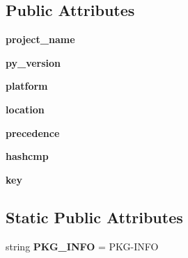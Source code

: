 \subsection*{Public Attributes}
\begin{DoxyCompactItemize}
\item 
\mbox{\label{classpkg__resources_1_1_distribution_a5a41ba765e57c1fe39b6405c2dff69c7}} 
{\bfseries project\+\_\+name}
\item 
\mbox{\label{classpkg__resources_1_1_distribution_a94c84ff74167eef63fecce9f5e3c2a85}} 
{\bfseries py\+\_\+version}
\item 
\mbox{\label{classpkg__resources_1_1_distribution_a0d3120e21ef127c42294a9ad2149613d}} 
{\bfseries platform}
\item 
\mbox{\label{classpkg__resources_1_1_distribution_a48f64f0791d0dffea14e22b9dbc210b3}} 
{\bfseries location}
\item 
\mbox{\label{classpkg__resources_1_1_distribution_afaa162e116709a2b7f4d5e2cd2f4bdcc}} 
{\bfseries precedence}
\item 
\mbox{\label{classpkg__resources_1_1_distribution_af308221b891f0ecdab82948e96bd77be}} 
{\bfseries hashcmp}
\item 
\mbox{\label{classpkg__resources_1_1_distribution_acd3cd8d8ebc1d5b72cee86c87e45049f}} 
{\bfseries key}
\end{DoxyCompactItemize}
\subsection*{Static Public Attributes}
\begin{DoxyCompactItemize}
\item 
\mbox{\label{classpkg__resources_1_1_distribution_a2c183fa8364c9029abea5a0f502ffbea}} 
string {\bfseries P\+K\+G\+\_\+\+I\+N\+FO} = \textquotesingle{}P\+KG-\/I\+N\+FO\textquotesingle{}
\end{DoxyCompactItemize}


